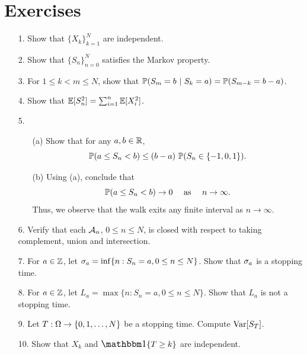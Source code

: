 \documentclass[main]{subfiles}
\begin{document}
\section{Exercises}
\begin{itemize}
    \item[1.]Show that $ \{X_k\}_{k=1}^N $ are independent.
    \item[2.]Show that $ \{S_n\}_{n=0}^N $ satisfies the Markov property.
    \item[3.]For $ 1\le k<m\le N $, show that $ \P(S_m=b\ |\ S_k=a)=\P(S_{m-k}=b-a) $.
    \item[4.]Show that $ \E[S_n^2]=\sum_{i=1}^n\E[X_i^2] $.
    \item[5.]
        \begin{itemize}
            \item[(a)]Show that for any $ a,b\in\R $, \[\P(a\le S_n < b)\le (b-a)\ \P(S_n\in\{-1,0,1\}).\]
            \item[(b)]Using (a), conclude that \[\P(a\le S_n < b) \to 0 \text{$\quad$ as$\quad$ } n\to\infty.\] Thus, we observe that the walk exits any finite interval as $ n\to\infty $.
        \end{itemize}
        \item[6.]Verify that each $ \A_n $, $ 0\le n\le N $, is closed with respect to taking complement, union and intersection.
        \item[7.]For $ a\in\Z $, let $ \s_a=\inf\{n: S_n=a, 0\le n\le N\} $. Show that $ \s_a $ is a stopping time.
        \item[8.]For $ a\in\Z $, let $ L_a=\max\{n: S_n=a, 0\le n\le N\}$. Show that $ L_a $ is not a stopping time.
        \item[9.]Let $ T:\O\to\{0,1,\ldots,N\} $ be a stopping time. Compute $ \Var[S_T] $.
        \item[10.]Show that $ X_k $ and $ \mathlarger{\one\{T\ge k\}} $ are independent.
\end{itemize}
\end{document}
